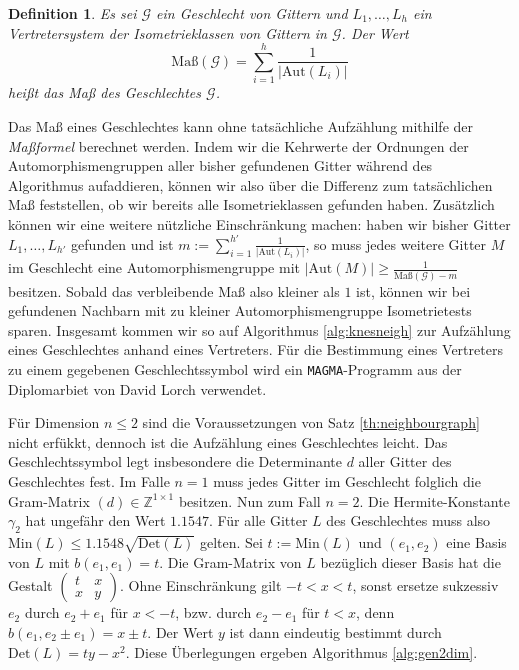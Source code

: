 \documentclass[12pt,a4paper,halfparskip,headsepline,bibtotocnumbered]{scrreprt}
\theoremstyle{nummermitklammern}
\newtheorem{definition}[defsatzusw]{Definition}
\theoremstyle{nonumberbreak}
\newcommand{\Z}{\mathbb{Z}}
\newcommand{\Det}{\text{Det}}
\newcommand{\Min}{\text{Min}}
\newcommand{\Aut}{\text{Aut}}
\begin{document}
\begin{framed}
	\begin{definition}
		Es sei $\mathcal{G}$ ein Geschlecht von Gittern und $L_1, \dots, L_h$ ein Vertretersystem der Isometrieklassen von Gittern in $\mathcal{G}$. Der Wert
		\begin{equation*}
			\text{Maß}(\mathcal{G}) = \sum_{i=1}^h \frac{1}{\vert \Aut(L_i) \vert}
		\end{equation*}
		heißt das \textit{Maß} des Geschlechtes $\mathcal{G}$.
	\end{definition}
\end{framed}

Das Maß eines Geschlechtes kann ohne tatsächliche Aufzählung mithilfe der \textit{Maßformel} berechnet werden. Indem wir die Kehrwerte der Ordnungen der Automorphismengruppen aller bisher gefundenen Gitter während des Algorithmus aufaddieren, können wir also über die Differenz zum tatsächlichen Maß feststellen, ob wir bereits alle Isometrieklassen gefunden haben. Zusätzlich können wir eine weitere nützliche Einschränkung machen: haben wir bisher Gitter $L_1, \dots, L_{h'}$ gefunden und ist $m := \sum_{i=1}^{h'} \frac{1}{\vert \Aut(L_i) \vert}$, so muss jedes weitere Gitter $M$ im Geschlecht eine Automorphismengruppe mit $\vert \Aut(M) \vert \geq \frac{1}{\text{Maß}(\mathcal{G}) - m}$ besitzen. Sobald das verbleibende Maß also kleiner als $1$ ist, können wir bei gefundenen Nachbarn mit zu kleiner Automorphismengruppe Isometrietests sparen. Insgesamt kommen wir so auf Algorithmus \eqref{alg:knesneigh} zur Aufzählung eines Geschlechtes anhand eines Vertreters. Für die Bestimmung eines Vertreters zu einem gegebenen Geschlechtssymbol wird ein \texttt{MAGMA}-Programm aus der Diplomarbiet von David Lorch \cite{lorch} verwendet.\par
Für Dimension $n \leq 2$ sind die Voraussetzungen von Satz \eqref{th:neighbourgraph} nicht erfükkt, dennoch ist die Aufzählung eines Geschlechtes leicht. Das Geschlechtssymbol legt insbesondere die Determinante $d$ aller Gitter des Geschlechtes fest. Im Falle $n = 1$ muss jedes Gitter im Geschlecht folglich die Gram-Matrix $(d) \in \Z^{1 \times 1}$ besitzen. Nun zum Fall $n = 2$. Die Hermite-Konstante $\gamma_2$ hat ungefähr den Wert $1.1547$. Für alle Gitter $L$ des Geschlechtes muss also $\Min(L) \leq 1.1548 \sqrt{\Det(L)}$ gelten. Sei $t := \Min(L)$ und $(e_1, e_2)$ eine Basis von $L$ mit $b(e_1, e_1) = t$. Die Gram-Matrix von $L$ bezüglich dieser Basis hat die Gestalt $\left(\begin{matrix} t & x\\x & y\end{matrix}\right)$. Ohne Einschränkung gilt $-t < x < t$, sonst ersetze sukzessiv $e_2$ durch $e_2 + e_1$ für $x < -t$, bzw. durch $e_2 - e_1$ für $t < x$, denn $b(e_1, e_2 \pm e_1) = x \pm t$. Der Wert $y$ ist dann eindeutig bestimmt durch $\Det(L) =  ty - x^2$. Diese Überlegungen ergeben Algorithmus \eqref{alg:gen2dim}.
\end{document}
